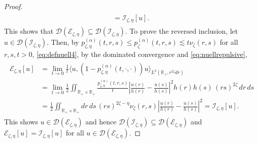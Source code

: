\documentclass[10pt,a4paper]{amsart}
\def\ce{\mathcal{E}}
\def\ci{\mathcal{I}}
\newcommand{\D}{\mathcal{D}}
\newcommand{\R}{\mathbb{R}}
\begin{document}
\begin{proof}
\begin{align}
\begin{split}
        = \ci_{\zeta,\eta}[u].
    \end{split}
  \end{align}
  This shows that $\D(\ce_{\zeta,\eta})\subseteq\D(\ci_{\zeta,\eta})$. To prove the reversed inclusion, let $u\in\D(\ci_{\zeta,\eta})$. Then, by $p_{\zeta,\eta}^{(\alpha)}(t,r,s)\leq p_\zeta^{(\alpha)}(t,r,s)\lesssim t\nu_\zeta(r,s)$ for all $r,s,t>0$, \eqref{eq:defnuell4}, by the dominated convergence and \eqref{eq:nuellrepulsive},
  \begin{align}
    \begin{split}
      \ce_{\zeta,\eta}[u]
      & = \lim_{t\to0}\frac1t\langle u,(1-p_{\zeta,\eta}^{(\alpha)}(t,\cdot,\cdot))u\rangle_{L^2(\R_+,r^{2\zeta}dr)} \\
      & = \lim_{t\to0}\frac12 \iint_{\R_+\times\R_+}\frac{p_{\zeta,\eta}^{(\alpha)}(t,r,s)}{t} \left|\frac{u(r)}{h(r)} - \frac{u(s)}{h(s)}\right|^2 h(r)h(s)\, (rs)^{2\zeta}\,dr\,ds \\
      & = \frac12 \iint_{\R_+\times\R_+}dr\,ds\, (rs)^{2\zeta-\eta}\nu_\zeta(r,s) \left|\frac{u(r)}{h(r)} - \frac{u(s)}{h(s)}\right|^2
      = \ci_{\zeta,\eta}[u].
    \end{split}
  \end{align}
  This shows $u\in\D(\ce_{\zeta,\eta})$ and hence $\D(\ci_{\zeta,\eta})\subseteq\D(\ce_{\zeta,\eta})$
  and $\ce_{\zeta,\eta}[u]=\ci_{\zeta,\eta}[u]$ for all $u\in\D(\ce_{\zeta,\eta})$.
\end{proof}
\end{document}
